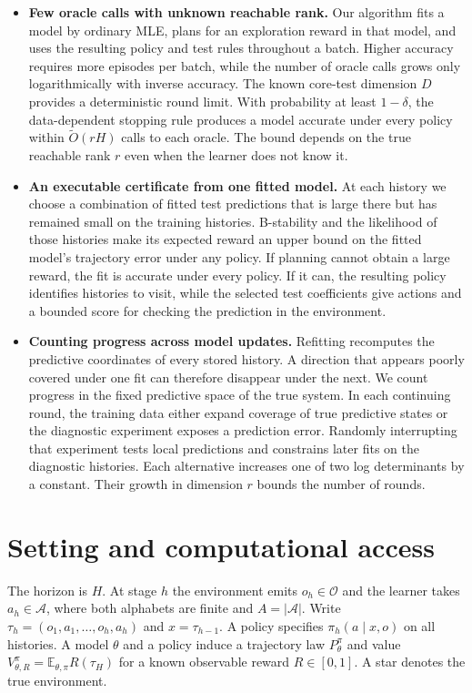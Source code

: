 \documentclass[sigconf,nonacm]{acmart}
\newcommand{\E}{\mathbb E}
\newcommand{\A}{\mathcal A}
\newcommand{\Obs}{\mathcal O}
\newcommand{\softO}{\widetilde O}
\begin{document}
\begin{itemize}
\item \textbf{Few oracle calls with unknown reachable rank.}
Our algorithm fits a model by ordinary MLE, plans for an exploration reward in that model, and uses the resulting policy and test rules throughout a batch. Higher accuracy requires more episodes per batch, while the number of oracle calls grows only logarithmically with inverse accuracy. The known core-test dimension $D$ provides a deterministic round limit. With probability at least $1-\delta$, the data-dependent stopping rule produces a model accurate under every policy within $\softO(rH)$ calls to each oracle. The bound depends on the true reachable rank $r$ even when the learner does not know it.

\item \textbf{An executable certificate from one fitted model.}
At each history we choose a combination of fitted test predictions that is large there but has remained small on the training histories. B-stability and the likelihood of those histories make its expected reward an upper bound on the fitted model's trajectory error under any policy. If planning cannot obtain a large reward, the fit is accurate under every policy. If it can, the resulting policy identifies histories to visit, while the selected test coefficients give actions and a bounded score for checking the prediction in the environment.

\item \textbf{Counting progress across model updates.}
Refitting recomputes the predictive coordinates of every stored history. A direction that appears poorly covered under one fit can therefore disappear under the next. We count progress in the fixed predictive space of the true system. In each continuing round, the training data either expand coverage of true predictive states or the diagnostic experiment exposes a prediction error. Randomly interrupting that experiment tests local predictions and constrains later fits on the diagnostic histories. Each alternative increases one of two log determinants by a constant. Their growth in dimension $r$ bounds the number of rounds.
\end{itemize}

\section{Setting and computational access}\label{sec:setting}
The horizon is $H$. At stage $h$ the environment emits $o_h\in\Obs$ and the learner takes $a_h\in\A$, where both alphabets are finite and $A=|\A|$. Write $\tau_h=(o_1,a_1,\ldots,o_h,a_h)$ and $x=\tau_{h-1}$. A policy specifies $\pi_h(a\mid x,o)$ on all histories. A model $\theta$ and a policy induce a trajectory law $P_\theta^\pi$ and value $V_{\theta,R}^\pi=\E_{\theta,\pi}R(\tau_H)$ for a known observable reward $R\in[0,1]$. A star denotes the true environment.
\end{document}
